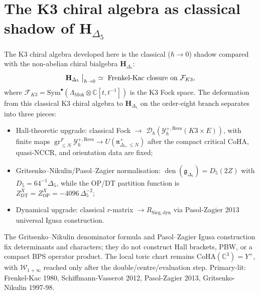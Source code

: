\section{The K3 chiral algebra as classical shadow of \texorpdfstring{$\mathbf H_{\Delta_5}$}{H-Delta-5}}
\label{sec:k3ca-classical-shadow}

\begin{remark}
\label{rem:k3ca-classical-shadow-synthesis}
The K3 chiral algebra developed here is the classical ($\hbar\to 0$)
shadow compared with the non-abelian chiral bialgebra
$\mathbf H_{\Delta_5}$:
\[
\mathbf H_{\Delta_5}\bigm|_{\hbar\to 0}\ \simeq\ \text{Frenkel-Kac closure on}\ \mathcal F_{K3},
\]
where $\mathcal F_{K3} = \mathrm{Sym}^\bullet(\Lambda_{\mathrm{Muk}}\otimes\mathbb C[t,t^{-1}])$
is the K3 Fock space. The deformation from this classical K3 chiral
algebra to $\mathbf H_{\Delta_5}$ on the order-eight branch separates into
three pieces:
\begin{itemize}
\item Hall-theoretic upgrade: classical Fock $\to$
 $\mathcal D_\hbar(\mathcal Y^{+,\mathrm{Rees}}_\hbar(K3\times E))$,
 with finite maps
 $\operatorname{gr}^{F}_{\leq N}\mathcal Y^{+,\mathrm{Rees}}_\hbar
 \to U(\mathfrak n^+_{\Delta_5,\leq N})$ after the compact critical
 CoHA, quasi-NCCR, and orientation data are fixed;
\item Gritsenko--Nikulin/Pasol--Zagier normalisation:
 $\operatorname{den}(\mathfrak g_{\Delta_5})=D_5(2Z)$ with
 $D_5=64^{-1}\Delta_5$, while the OP/DT partition function is
 $Z^X_{\mathrm{DT}}=Z^X_{\mathrm{OP}}=-4096\,\Delta_5^{-2}$;
\item Dynamical upgrade: classical $r$-matrix $\to R_{\mathrm{Sieg,dyn}}$
 via Pasol-Zagier 2013 universal Igusa construction.
\end{itemize}
The Gritsenko--Nikulin denominator formula and Pasol--Zagier Igusa construction fix determinants and characters; they do not
construct Hall brackets, PBW, or a compact BPS operator product.  The
local toric chart remains $\mathrm{CoHA}(\mathbb C^3)=Y^+$, with
\(\mathcal W_{1+\infty}\) reached only after the double/centre/evaluation
step. Primary-lit: Frenkel-Kac 1980, Schiffmann-Vasserot 2012,
Pasol-Zagier 2013, Gritsenko-Nikulin 1997-98.
\end{remark}

